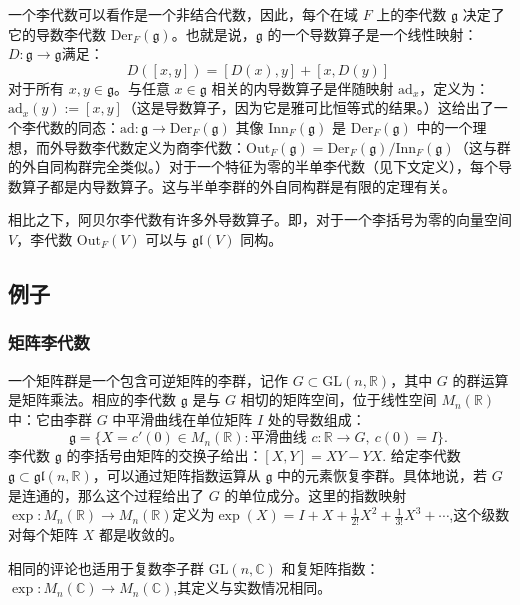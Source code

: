 一个李代数可以看作是一个非结合代数，因此，每个在域 \( F \) 上的李代数 \( \mathfrak{g} \) 决定了它的导数李代数 \( \text{Der}_F(\mathfrak{g}) \)。也就是说，\( \mathfrak{g} \) 的一个导数算子是一个线性映射：\(D \colon \mathfrak{g} \to \mathfrak{g}\)满足：
\[
D([x,y]) = [D(x),y] + [x,D(y)]~
\]
对于所有 \( x, y \in \mathfrak{g} \)。与任意 \( x \in \mathfrak{g} \) 相关的内导数算子是伴随映射 \( \mathrm{ad}_x \)，定义为：\(\mathrm{ad}_x(y) := [x, y]\)（这是导数算子，因为它是雅可比恒等式的结果。）这给出了一个李代数的同态：\(\mathrm{ad} \colon \mathfrak{g} \to \text{Der}_F(\mathfrak{g})\)
其像 \( \text{Inn}_F(\mathfrak{g}) \) 是 \( \text{Der}_F(\mathfrak{g}) \) 中的一个理想，而外导数李代数定义为商李代数：\(\text{Out}_F(\mathfrak{g}) = \text{Der}_F(\mathfrak{g}) / \text{Inn}_F(\mathfrak{g})\)（这与群的外自同构群完全类似。）对于一个特征为零的半单李代数（见下文定义），每个导数算子都是内导数算子。这与半单李群的外自同构群是有限的定理有关。

相比之下，阿贝尔李代数有许多外导数算子。即，对于一个李括号为零的向量空间 \( V \)，李代数 \( \text{Out}_F(V) \) 可以与 \( \mathfrak{gl}(V) \) 同构。
\subsection{例子}
\subsubsection{矩阵李代数}
一个矩阵群是一个包含可逆矩阵的李群，记作 \( G \subset \mathrm{GL}(n, \mathbb{R}) \)，其中 \( G \) 的群运算是矩阵乘法。相应的李代数 \( \mathfrak{g} \) 是与 \( G \) 相切的矩阵空间，位于线性空间 \( M_n(\mathbb{R}) \) 中：它由李群 \( G \) 中平滑曲线在单位矩阵 \( I \) 处的导数组成：
\[
\mathfrak{g} = \{ X = c'(0) \in M_n(\mathbb{R}) : \text{平滑曲线 } c : \mathbb{R} \to G, \ c(0) = I \}.~
\]
李代数 \( \mathfrak{g} \) 的李括号由矩阵的交换子给出：\([X, Y] = XY - YX\).
给定李代数 \( \mathfrak{g} \subset \mathfrak{gl}(n, \mathbb{R}) \)，可以通过矩阵指数运算从 \( \mathfrak{g} \) 中的元素恢复李群。具体地说，若 \( G \) 是连通的，那么这个过程给出了 \( G \) 的单位成分。这里的指数映射\(\exp : M_n(\mathbb{R}) \to M_n(\mathbb{R})\)定义为\(\exp(X) = I + X + \frac{1}{2!}X^2 + \frac{1}{3!}X^3 + \cdots\),这个级数对每个矩阵 \( X \) 都是收敛的。

相同的评论也适用于复数李子群 \( \mathrm{GL}(n, \mathbb{C}) \) 和复矩阵指数：\(\exp : M_n(\mathbb{C}) \to M_n(\mathbb{C})\),其定义与实数情况相同。

